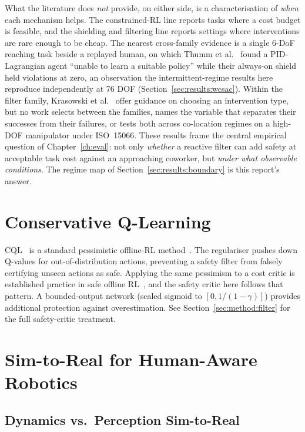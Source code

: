 \documentclass[11pt,a4paper]{report}
\newcommand{\iso}{ISO~15066}
\begin{document}
What the literature does \emph{not} provide, on either side, is a
characterisation of \emph{when} each mechanism helps. The
constrained-RL line reports tasks where a cost budget is feasible,
and the shielding and filtering line reports settings where
interventions are rare enough to be cheap. The nearest cross-family
evidence is a single 6-DoF reaching task beside a replayed human, on
which Thumm et al.~\cite{thumm2023interventions} found a
PID-Lagrangian agent ``unable to learn a suitable policy'' while
their always-on shield held violations at zero, an observation the
intermittent-regime results here reproduce independently at 76 DOF
(Section~\ref{sec:results:wcsac}). Within the filter family,
Krasowski et al.~\cite{krasowski2023provablysafe} offer guidance on
choosing an intervention type, but no work selects between the
families, names the variable that separates their successes from
their failures, or tests both across co-location regimes on a
high-DOF manipulator under \iso{}. These results frame the central
empirical question of Chapter~\ref{ch:eval}: not only \emph{whether}
a reactive filter can add safety at acceptable task cost against an
approaching coworker, but \emph{under what observable conditions}.
The regime map of Section~\ref{sec:results:boundary} is this
report's answer.

\section{Conservative Q-Learning}
\label{sec:bg:cql}

\textsc{CQL}~\cite{kumar2020cql} is a standard pessimistic
offline-RL method~\cite{prudencio2024offlinesurvey}. The regulariser
pushes down Q-values for out-of-distribution actions, preventing a
safety filter from falsely certifying unseen actions as safe.
Applying the same pessimism to a cost critic is established practice
in safe offline RL~\cite{xu2022cpq}, and the safety critic here
follows that pattern. A bounded-output network
(scaled sigmoid to $[0, 1/(1-\gamma)]$) provides additional
protection against overestimation. See
Section~\ref{sec:method:filter} for the full safety-critic
treatment.

\section{Sim-to-Real for Human-Aware Robotics}
\label{sec:bg:sim2real}

\subsection{Dynamics vs.\ Perception Sim-to-Real}
\label{sec:bg:sim2real:dyn-perc}
\end{document}
